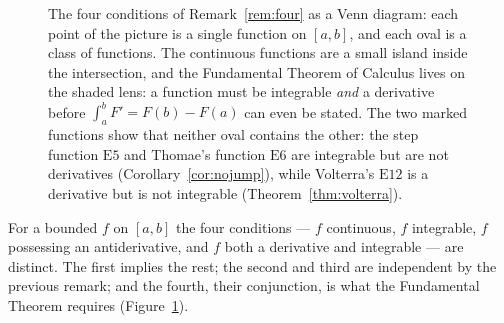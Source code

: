\begin{figure}[htbp]
\centering
{}
\caption{The four conditions of Remark~\ref{rem:four} as a Venn diagram:
each point of the picture is a single function on $[a,b]$, and each oval is
a class of functions. The continuous functions are a small island inside
the intersection, and the Fundamental Theorem of Calculus lives on the
shaded lens: a function must be integrable \emph{and} a derivative before
$\int_a^b F' = F(b)-F(a)$ can even be stated. The two marked functions show
that neither oval contains the other: the step function $\mathrm{E}5$ and
Thomae's function $\mathrm{E}6$ are integrable but are not derivatives
(Corollary~\ref{cor:nojump}), while Volterra's $\mathrm{E}12$ is a
derivative but is not integrable (Theorem~\ref{thm:volterra}).}
\label{fig:ftc}
\end{figure}

\begin{remark}\label{rem:four}
For a bounded $f$ on $[a,b]$ the four conditions --- $f$ continuous, $f$
integrable, $f$ possessing an antiderivative, and $f$ both a derivative and
integrable --- are distinct. The first implies the rest; the second and third
are independent by the previous remark; and the fourth, their conjunction, is
what the Fundamental Theorem requires (Figure~\ref{fig:ftc}).
\end{remark}

